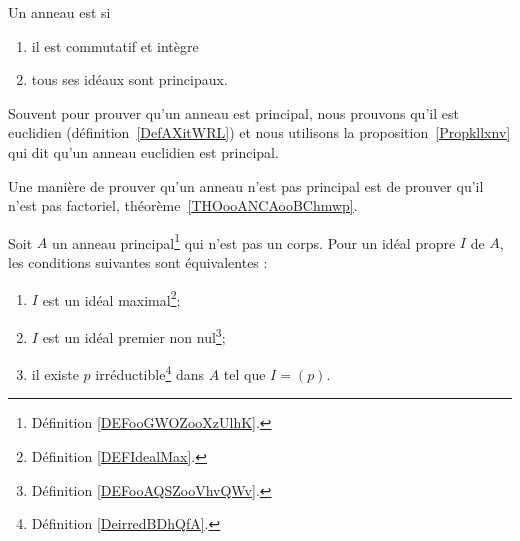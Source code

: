 \begin{definition}          \label{DEFooGWOZooXzUlhK}
    Un anneau est  si
    \begin{enumerate}
        \item
            il est commutatif et intègre
        \item
            tous ses idéaux sont principaux.
    \end{enumerate}
\end{definition}

Souvent pour prouver qu'un anneau est principal, nous prouvons qu'il est euclidien (définition~\ref{DefAXitWRL}) et nous utilisons la proposition~\ref{Propkllxnv} qui dit qu'un anneau euclidien est principal.

Une manière de prouver qu'un anneau n'est pas principal est de prouver qu'il n'est pas factoriel, théorème~\ref{THOooANCAooBChmwp}.

\begin{proposition} \label{PropomqcGe}
    Soit \( A\) un anneau principal\footnote{Définition \ref{DEFooGWOZooXzUlhK}.} qui n'est pas un corps. Pour un idéal propre \( I\) de \( A\), les conditions suivantes sont équivalentes :
    \begin{enumerate}
        \item       \label{ITEMooNOVFooEHtcwE}
            \( I\) est un idéal maximal\footnote{Définition \ref{DEFIdealMax}.};
        \item       \label{ITEMooMQWVooNocVEU}
            \( I\) est un idéal premier non nul\footnote{Définition \ref{DEFooAQSZooVhvQWv}.};
        \item       \label{ITEMooJBXGooEISNuW}
            il existe \( p\) irréductible\footnote{Définition \ref{DeirredBDhQfA}.} dans \( A\) tel que \( I=(p)\).
    \end{enumerate}
\end{proposition}

